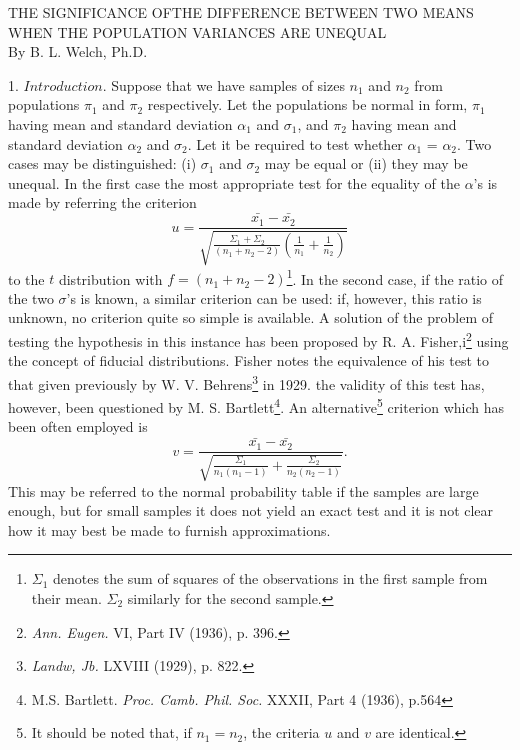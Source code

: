 \documentclass[12pt]{article}
\begin{document}
\begin{center}
THE SIGNIFICANCE OFTHE DIFFERENCE BETWEEN TWO MEANS WHEN THE POPULATION VARIANCES ARE UNEQUAL\\
By B. L. Welch, Ph.D.
\end{center}

1. $\textit{Introduction}$. Suppose that we have samples of sizes $n_1$ and $n_2$ from
populations $\pi_1$ and $\pi_2$ respectively. Let the populations be normal in
form, $\pi_1$ having mean and standard deviation $\alpha_1$ and $\sigma_1$, and
$\pi_2$ having mean and standard deviation $\alpha_2$ and $\sigma_2$. Let it be
required to test whether $\alpha_1$ = $\alpha_2$.  Two cases may be
distinguished: (i) $\sigma_1$ and $\sigma_2$ may be equal or (ii) they may be
unequal. In the first case the most appropriate test for the equality of the
$\alpha$'s is made by referring the criterion
\begin{equation}
u = \frac{\bar{x_1}-\bar{x_2}}{\sqrt{\frac{\Sigma_1+\Sigma_2}{(n_1+n_2-2)}\left(\frac{1}{n_1}+\frac{1}{n_2}\right)}}
\end{equation}
to the $t$ distribution with $f=(n_1+n_2-2)$\footnote{$\Sigma_1$ denotes the sum of squares of the observations in the first sample from their mean. $\Sigma_2$ similarly for the second sample.}. In the second case, if the ratio of the
two $\sigma$'s is known, a similar criterion can be used: if, however, this ratio
is unknown, no criterion quite so simple is available. A solution of the problem
of testing the hypothesis in this instance has been proposed by R. A. Fisher,i\footnote{\textit{Ann. Eugen.} VI, Part IV (1936), p. 396.}
using the concept of fiducial distributions. Fisher notes the equivalence of his
test to that given previously by W. V. Behrens\footnote{\textit{Landw, Jb.} LXVIII (1929), p. 822.} in 1929. the validity of this
test has, however, been questioned by M. S. Bartlett\footnote{M.S. Bartlett. \textit{Proc. Camb. Phil. Soc.} XXXII, Part 4 (1936), p.564}. An alternative\footnote{It should be noted that, if $n_1=n_2$, the criteria $u$ and $v$ are identical.} criterion
which has been often employed is
\begin{equation}
v = \frac{\bar{x_1}-\bar{x_2}}{\sqrt{\frac{\Sigma_1}{n_1(n_1-1)}+\frac{\Sigma_2}{n_2(n_2-1)}}}.
\end{equation}
This may be referred to the normal probability table if the samples are large
enough, but for small samples it does not yield an exact test and it is not
clear how it may best be made to furnish approximations.
\end{document}
